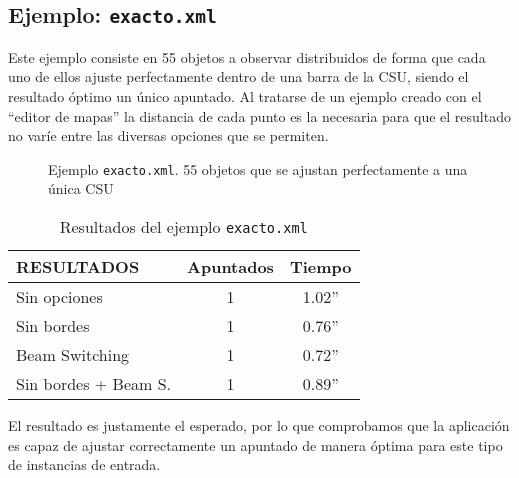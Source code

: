 \subsection {Ejemplo: \texttt{exacto.xml}}
Este ejemplo consiste en 55 objetos a observar distribuidos de forma que cada
uno de ellos ajuste perfectamente dentro de una barra de la CSU, siendo el
resultado óptimo un único apuntado. Al tratarse de un ejemplo creado con el ``editor de
mapas'' la distancia de cada punto es la necesaria para que el resultado no
varíe entre las diversas opciones que se permiten.


\begin{figure}[!htb]
\centering
{}
\caption{Ejemplo \texttt{exacto.xml}. 55 objetos que se ajustan perfectamente a una única CSU}
\end{figure}
\begin{table*}[!ht]
\centering
\begin{tabular}{||l||c|c||}
\hline
\hline
RESULTADOS & Apuntados & Tiempo \\
\hline
\hline
Sin opciones & 1 & 1.02'' \\
\hline
Sin bordes & 1 & 0.76'' \\
\hline
Beam Switching & 1 & 0.72'' \\
\hline
Sin bordes + Beam S. & 1 & 0.89'' \\
\hline
\hline
\end{tabular}
\caption{Resultados del ejemplo \texttt{exacto.xml}}
\end{table*}

El resultado es justamente el esperado, por lo que comprobamos que la aplicación es capaz
de ajustar correctamente un apuntado de manera óptima para este tipo de instancias de entrada.

